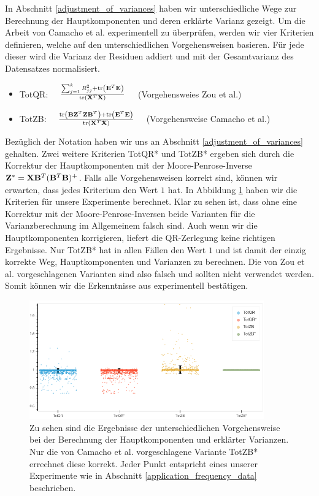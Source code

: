 In Abschnitt \ref{adjustment_of_variances} haben wir unterschiedliche Wege zur Berechnung der Hauptkomponenten und deren erklärte Varianz gezeigt. Um die Arbeit von Camacho et al. \cite{camacho} experimentell zu überprüfen, werden wir vier Kriterien definieren, welche auf den unterschiedlichen Vorgehensweisen basieren. Für jede dieser wird die Varianz der Residuen addiert und mit der Gesamtvarianz des Datensatzes normalisiert.
\begin{itemize}
\item TotQR: $\quad \frac{\sum_{j=1}^k R_{jj}^2 + \text{tr} \left( \mathbf{E}^T\mathbf{E} \right)}{\text{tr} \left( \mathbf{X}^T\mathbf{X} \right)} \quad$ (Vorgehensweies Zou et al.)
\item TotZB: $\quad \frac{\text{tr} \left( \mathbf{B} \mathbf{Z}^T \mathbf{Z} \mathbf{B}^T \right) + \text{tr} \left( \mathbf{E}^T\mathbf{E} \right)}{\text{tr} \left( \mathbf{X}^T\mathbf{X} \right)} \quad$ (Vorgehensweise Camacho et al.)
\end{itemize}
Bezüglich der Notation haben wir uns an Abschnitt \ref{adjustment_of_variances} gehalten. Zwei weitere Kriterien TotQR* und TotZB* ergeben sich durch die Korrektur der Hauptkomponenten mit der Moore-Penrose-Inverse $\mathbf{Z}^* = \mathbf{X} \mathbf{B}^T (\mathbf{B}^T\mathbf{B})^+$. Falls alle Vorgehensweisen korrekt sind, können wir erwarten, dass jedes Kriterium den Wert $1$ hat. In Abbildung \ref{total_variance_validation} haben wir die Kriterien für unsere Experimente berechnet. Klar zu sehen ist, dass ohne eine Korrektur mit der Moore-Penrose-Inversen beide Varianten für die Varianzberechnung im Allgemeinem falsch sind. Auch wenn wir die Hauptkomponenten korrigieren, liefert die QR-Zerlegung keine richtigen Ergebnisse. Nur TotZB* hat in allen Fällen den Wert $1$ und ist damit der einzig korrekte Weg, Hauptkomponenten und Varianzen zu berechnen. Die von Zou et al. \cite{zou_sparsepca} vorgeschlagenen Varianten sind also falsch und sollten nicht verwendet werden. Somit können wir die Erkenntnisse aus \cite{camacho} experimentell bestätigen.

\begin{figure}
\centering
\includegraphics[width = 0.9\textwidth]{figures/total_variance_validation.png}
\caption{Zu sehen sind die Ergebnisse der unterschiedlichen Vorgehensweise bei der Berechnung der Hauptkomponenten und erklärter Varianzen. Nur die von Camacho et al. vorgeschlagene Variante TotZB* errechnet diese korrekt. Jeder Punkt entspricht eines unserer Experimente wie in Abschnitt \ref{application_frequency_data} beschrieben.}
\label{total_variance_validation}
\end{figure}